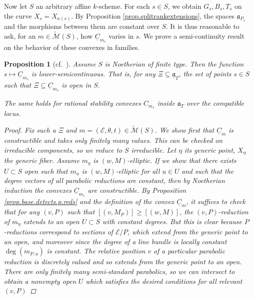 \documentclass[openany]{amsbook}
\newtheorem{proposition}[theorem]{Proposition}
\theoremstyle{definition}
\theoremstyle{remark}
\numberwithin{equation}{section}
\newcommand{\cM}{\mathcal{M}}
\newcommand{\cE}{\mathcal{E}}
\newcommand{\ul}[1]{\underline{#1}}
\renewcommand{\-}{\operatorname{-}}
\renewcommand{\a}{\mathfrak{a}}
\newcommand{\ctM}{\widetilde{\cM}}
\newcommand{\ga}{\ul{\a}}
\begin{document}
Now let $S$ an arbitrary affine $k$-scheme. For each $s \in S$, we obtain $G_s,B_s,T_s$ on the curve $X_{s} = X_{\kappa(s)}$. By Proposition \ref{prop.splitrankextensions}, the spaces $\a_{P_s}$ and the morphisms between them are constant over $S$. It is thus reasonable to ask, for an $m \in \ctM(S)$, how $\ul{C}_{m_s}$ varies in $s$. We prove a semi-continuity result on the behavior of these convexes in families. 
\begin{proposition}[{{cf.\ \cite[Prop. 5.6.1]{CLI}}}] \label{prop.semicts}
    Assume $S$ is Noetherian of finite type. Then the function $s \mapsto \ul{C}_{m_s}$ is \textit{lower-semicontinuous}. That is, for any $\Xi \subseteq \ga_T$, the set of points $s \in S$ such that $\Xi \subseteq \ul{C}_{m_s}$ is \textit{open} in $S$. 

    The same holds for rational stability convexes $C_{m_s}$ inside $\a_T$ over the compatible locus.
    \begin{proof}
        Fix such a $\Xi$ and $m = (\cE, \theta, t) \in \ctM(S)$. We show first that $\ul{C}_m$ is constructible and takes only finitely many values. This can be checked on irreducible components, so we reduce to $S$ irreducible. Let $\eta$ its generic point, $X_{\eta}$ the generic fiber. Assume $m_{\eta}$ is $(w,M)$-elliptic. If we show that there exists $U \subset S$ open such that $m_u$ is $(w,M)$-elliptic for all $u \in U$ and such that the degree vectors of all parabolic reductions are constant, then by Noetherian induction the convexes $\ul{C}_{m_s}$ are constructible. By Proposition \ref{prop.base.detects.p.reds} and the definition of the convex $\ul{C}_{m}$, it suffices to check that for any $(v,P)$ such that $[(v, M_P)] \ge [(w, M)]$, the $(v,P)$-reduction of $m_{\eta}$ extends to an open $U \subset S$ with constant degrees. But this is clear because $P$-reductions correspond to sections of $\cE/P$, which extend from the generic point to an open, and moreover since the degree of a line bundle is locally constant $\deg(m_{P,u})$ is constant. The relative position $v$ of a particular parabolic reduction is discretely valued and so extends from the generic point to an open. There are only finitely many semi-standard parabolics, so we can intersect to obtain a nonempty open $U$ which satisfies the desired conditions for all relevant $(v,P)$


\end{proof}
\end{proposition}
\end{document}
